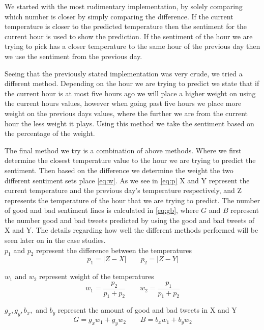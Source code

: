 \documentclass[journal]{vgtc}                %
\begin{document}
We started with the most rudimentary implementation, by solely comparing which number is closer by simply comparing the difference. If the current temperature is closer to the predicted temperature then the sentiment for the current hour is used to show the prediction. If the sentiment of the hour we are trying to pick has a closer temperature to the same hour of the previous day then we use the sentiment from the previous day. 

Seeing that the previously stated implementation was very crude, we tried a different method. Depending on the hour we are trying to predict we state that if the current hour is at most five hours ago we will place a higher weight on using the current hours values, however when going past five hours we place more weight on the previous days values, where the further we are from the current hour the less weight it plays. Using this method we take the sentiment based on the percentage of the weight.

The final method we try is a combination of above methods. Where we first determine the closest temperature value to the hour we are trying to predict the sentiment. Then based on the difference we determine the weight the two different sentiment sets place \eqref{eq:w}. As we see in \eqref{eq:p} X and Y represent the current temperature and the previous day's temperature respectively, and Z represents the temperature of the hour that we are trying to predict. The number of good and bad sentiment lines is calculated in \eqref{eq:gb}, where $G$ and $B$ represent the number good and bad tweets predicted by using the good and bad tweets of X and Y. The details regarding how well the different methods performed will be seen later on in the case studies.\\

$p_1$ and $p_2$ represent the difference between the temperatures
\begin{equation} \label{eq:p} p_{1}=\left | Z-X \right |	\qquad p_{2}=\left | Z-Y \right |	 \end{equation}

$w_1$ and $w_2$ represent weight of the temperatures
\begin{equation} \label{eq:w} w_{1}=\frac{p_{2}}{p_{1}+p_{2}} 	\qquad w_{2}=\frac{p_{1}}{p_{1}+p_{2}}   \end{equation}

$g_x, g_y, b_x,$ and $b_y$ represent the amount of good and bad tweets in X and Y
\begin{equation} \label{eq:gb}  G = g_{x}w_{1} + g_{y}w_{2}	\qquad B = b_{x}w_{1} + b_{y}w_{2}	 \end{equation}
\end{document}

